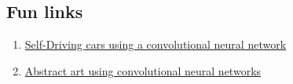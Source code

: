 \documentclass[%
oneside,                 %
final,                   %
10pt]{article}
\begin{document}
\subsection{Fun links}

\begin{enumerate}
\item \href{{https://arxiv.org/abs/1604.07316}}{Self-Driving cars using a convolutional neural network}

\item \href{{https://deepdreamgenerator.com/}}{Abstract art using convolutional neural networks}
\end{enumerate}

\noindent


\end{document}
